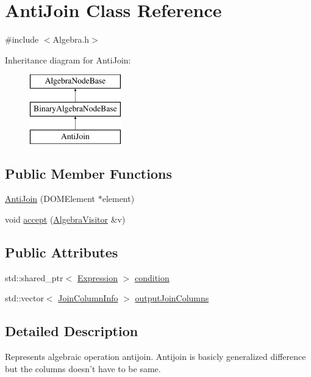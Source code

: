 \hypertarget{class_anti_join}{\section{Anti\+Join Class Reference}
\label{class_anti_join}
}


{\ttfamily \#include $<$Algebra.\+h$>$}

Inheritance diagram for Anti\+Join\+:\begin{figure}[H]
\begin{center}
\leavevmode
\includegraphics[height=3.000000cm]{class_anti_join}
\end{center}
\end{figure}
\subsection*{Public Member Functions}
\begin{DoxyCompactItemize}
\item 
\hyperlink{class_anti_join_a5cc6257a7d3b85eebc2326e2a5996dec}{Anti\+Join} (D\+O\+M\+Element $\ast$element)
\item 
void \hyperlink{class_anti_join_a95d753b1ed036be43a4fe00b40b775cf}{accept} (\hyperlink{class_algebra_visitor}{Algebra\+Visitor} \&v)
\end{DoxyCompactItemize}
\subsection*{Public Attributes}
\begin{DoxyCompactItemize}
\item 
std\+::shared\+\_\+ptr$<$ \hyperlink{class_expression}{Expression} $>$ \hyperlink{class_anti_join_a55e3da2742c4a24af7eee18cc5309206}{condition}
\item 
std\+::vector$<$ \hyperlink{class_join_column_info}{Join\+Column\+Info} $>$ \hyperlink{class_anti_join_af033e50994f2155c9f33926ec2ecd375}{output\+Join\+Columns}
\end{DoxyCompactItemize}


\subsection{Detailed Description}
Represents algebraic operation antijoin. Antijoin is basicly generalized difference but the columns doesn't have to be same. 

